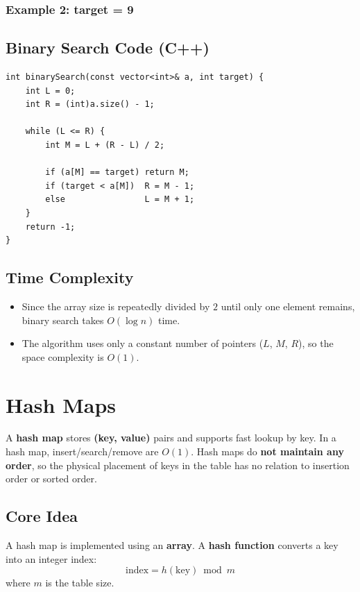 \documentclass{article}
\begin{document}
\subsubsection*{Example 2: target = 9}


\subsection{Binary Search Code (C++)}
\begin{verbatim}
int binarySearch(const vector<int>& a, int target) {
    int L = 0;
    int R = (int)a.size() - 1;

    while (L <= R) {
        int M = L + (R - L) / 2;

        if (a[M] == target) return M;
        if (target < a[M])  R = M - 1;
        else                L = M + 1;
    }
    return -1;
}
\end{verbatim}

\subsection{Time Complexity}
\begin{itemize}
  \item Since the array size is repeatedly divided by $2$ until only one element remains, binary search takes \textbf{$O(\log n)$} time.
  \item The algorithm uses only a constant number of pointers ($L$, $M$, $R$), so the space complexity is \textbf{$O(1)$}.
\end{itemize}
\section{Hash Maps}

A \textbf{hash map} stores \textbf{(key, value)} pairs and supports fast lookup by key.  
In a hash map, insert/search/remove are \textbf{$O(1)$}. Hash maps do \textbf{not maintain any order}, so the physical placement of keys in the table has no relation to insertion order or sorted order.

\subsection{Core Idea}
A hash map is implemented using an \textbf{array}. 
A \textbf{hash function} converts a key into an integer index:
\[
\text{index} = h(\text{key}) \bmod m
\]
where $m$ is the table size.
\end{document}
